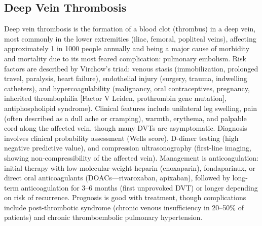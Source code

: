 \subsection{Deep Vein Thrombosis}
\label{sec:Deep Vein Thrombosis}
Deep vein thrombosis is the formation of a blood clot (thrombus) in a deep vein, most commonly in the lower extremities (iliac, femoral, popliteal veins), affecting approximately 1 in 1000 people annually and being a major cause of morbidity and mortality due to its most feared complication: pulmonary embolism. Risk factors are described by Virchow's triad: venous stasis (immobilization, prolonged travel, paralysis, heart failure), endothelial injury (surgery, trauma, indwelling catheters), and hypercoagulability (malignancy, oral contraceptives, pregnancy, inherited thrombophilia [Factor V Leiden, prothrombin gene mutation], antiphospholipid syndrome). Clinical features include unilateral leg swelling, pain (often described as a dull ache or cramping), warmth, erythema, and palpable cord along the affected vein, though many DVTs are asymptomatic. Diagnosis involves clinical probability assessment (Wells score), D-dimer testing (high negative predictive value), and compression ultrasonography (first-line imaging, showing non-compressibility of the affected vein). Management is anticoagulation: initial therapy with low-molecular-weight heparin (enoxaparin), fondaparinux, or direct oral anticoagulants (DOACs---rivaroxaban, apixaban), followed by long-term anticoagulation for 3--6 months (first unprovoked DVT) or longer depending on risk of recurrence. Prognosis is good with treatment, though complications include post-thrombotic syndrome (chronic venous insufficiency in 20--50\% of patients) and chronic thromboembolic pulmonary hypertension.

